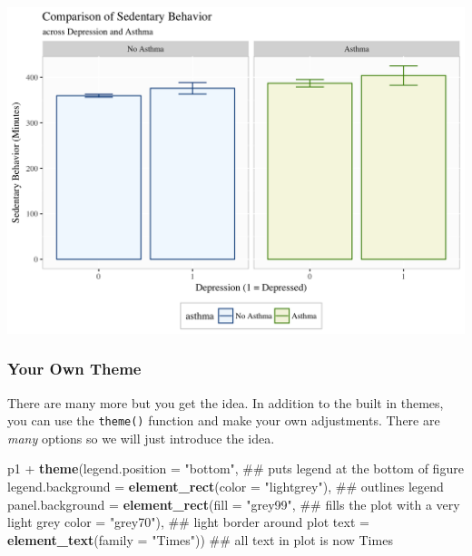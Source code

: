 \documentclass[]{tufte-book}
\newenvironment{Shaded}{}{}
\newcommand{\KeywordTok}[1]{\textcolor[rgb]{0.00,0.44,0.13}{\textbf{#1}}}
\newcommand{\DataTypeTok}[1]{\textcolor[rgb]{0.56,0.13,0.00}{#1}}
\newcommand{\StringTok}[1]{\textcolor[rgb]{0.25,0.44,0.63}{#1}}
\newcommand{\OperatorTok}[1]{\textcolor[rgb]{0.40,0.40,0.40}{#1}}
\newcommand{\NormalTok}[1]{#1}
\theoremstyle{definition}
\theoremstyle{definition}
\theoremstyle{remark}
\begin{document}
\includegraphics{_main_files/figure-latex/unnamed-chunk-156-1}

\subsubsection*{Your Own Theme}\label{your-own-theme}

There are many more but you get the idea. In addition to the built in
themes, you can use the \texttt{theme()} function and make your own
adjustments. There are \emph{many} options so we will just introduce the
idea.

\begin{Shaded}
\begin{Highlighting}[]
\NormalTok{p1 }\OperatorTok{+}\StringTok{ }
\StringTok{  }\KeywordTok{theme}\NormalTok{(}\DataTypeTok{legend.position =} \StringTok{"bottom"}\NormalTok{,  ## puts legend at the bottom of figure}
        \DataTypeTok{legend.background =} \KeywordTok{element_rect}\NormalTok{(}\DataTypeTok{color =} \StringTok{"lightgrey"}\NormalTok{),  ## outlines legend}
        \DataTypeTok{panel.background =} \KeywordTok{element_rect}\NormalTok{(}\DataTypeTok{fill =} \StringTok{"grey99"}\NormalTok{,   ## fills the plot with a very light grey}
                                        \DataTypeTok{color =} \StringTok{"grey70"}\NormalTok{),  ## light border around plot}
        \DataTypeTok{text =} \KeywordTok{element_text}\NormalTok{(}\DataTypeTok{family =} \StringTok{"Times"}\NormalTok{))     ## all text in plot is now Times}
\end{Highlighting}
\end{Shaded}
\end{document}
